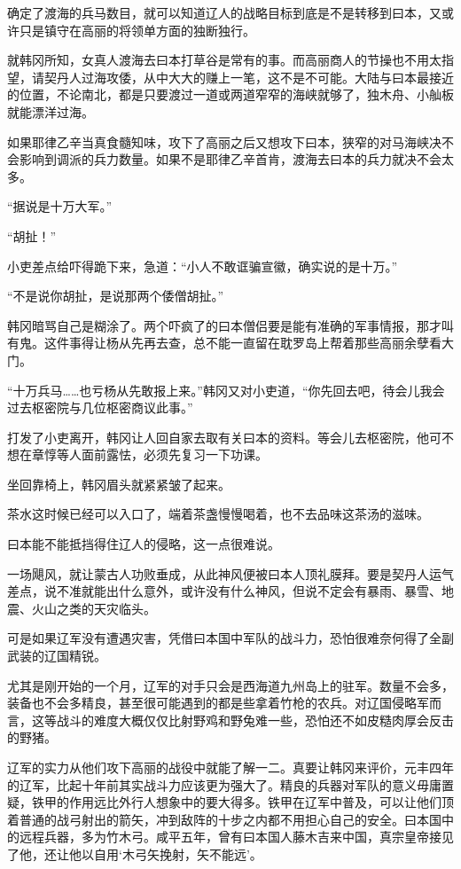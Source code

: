 确定了渡海的兵马数目，就可以知道辽人的战略目标到底是不是转移到曰本，又或许只是镇守在高丽的将领单方面的独断独行。

就韩冈所知，女真人渡海去曰本打草谷是常有的事。而高丽商人的节操也不用太指望，请契丹人过海攻倭，从中大大的赚上一笔，这不是不可能。大陆与曰本最接近的位置，不论南北，都是只要渡过一道或两道窄窄的海峡就够了，独木舟、小舢板就能漂洋过海。

如果耶律乙辛当真食髓知味，攻下了高丽之后又想攻下曰本，狭窄的对马海峡决不会影响到调派的兵力数量。如果不是耶律乙辛首肯，渡海去曰本的兵力就决不会太多。

“据说是十万大军。”

“胡扯！”

小吏差点给吓得跪下来，急道：“小人不敢诓骗宣徽，确实说的是十万。”

“不是说你胡扯，是说那两个倭僧胡扯。”

韩冈暗骂自己是糊涂了。两个吓疯了的曰本僧侣要是能有准确的军事情报，那才叫有鬼。这件事得让杨从先再去查，总不能一直留在耽罗岛上帮着那些高丽余孽看大门。

“十万兵马……也亏杨从先敢报上来。”韩冈又对小吏道，“你先回去吧，待会儿我会过去枢密院与几位枢密商议此事。”

打发了小吏离开，韩冈让人回自家去取有关曰本的资料。等会儿去枢密院，他可不想在章惇等人面前露怯，必须先复习一下功课。

坐回靠椅上，韩冈眉头就紧紧皱了起来。

茶水这时候已经可以入口了，端着茶盏慢慢喝着，也不去品味这茶汤的滋味。

曰本能不能抵挡得住辽人的侵略，这一点很难说。

一场飓风，就让蒙古人功败垂成，从此神风便被曰本人顶礼膜拜。要是契丹人运气差点，说不准就能出什么意外，或许没有什么神风，但说不定会有暴雨、暴雪、地震、火山之类的天灾临头。

可是如果辽军没有遭遇灾害，凭借曰本国中军队的战斗力，恐怕很难奈何得了全副武装的辽国精锐。

尤其是刚开始的一个月，辽军的对手只会是西海道九州岛上的驻军。数量不会多，装备也不会多精良，甚至很可能遇到的都是些拿着竹枪的农兵。对辽国侵略军而言，这等战斗的难度大概仅仅比射野鸡和野兔难一些，恐怕还不如皮糙肉厚会反击的野猪。

辽军的实力从他们攻下高丽的战役中就能了解一二。真要让韩冈来评价，元丰四年的辽军，比起十年前其实战斗力应该更为强大了。精良的兵器对军队的意义毋庸置疑，铁甲的作用远比外行人想象中的要大得多。铁甲在辽军中普及，可以让他们顶着普通的战弓射出的箭矢，冲到敌阵的十步之内都不用担心自己的安全。曰本国中的远程兵器，多为竹木弓。咸平五年，曾有曰本国人藤木吉来中国，真宗皇帝接见了他，还让他以自用‘木弓矢挽射，矢不能远’。

